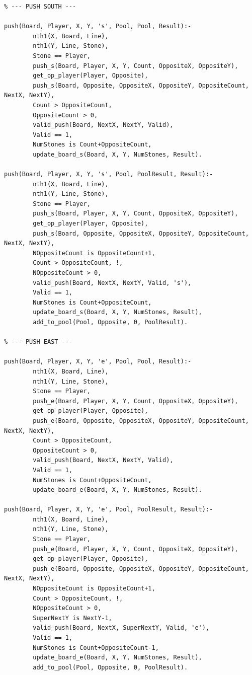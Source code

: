 \documentclass[a4paper]{article}
\begin{document}
\begin{lstlisting}
% --- PUSH SOUTH ---

push(Board, Player, X, Y, 's', Pool, Pool, Result):- 
        nth1(X, Board, Line),
        nth1(Y, Line, Stone),
        Stone == Player,
        push_s(Board, Player, X, Y, Count, OppositeX, OppositeY),
        get_op_player(Player, Opposite),
        push_s(Board, Opposite, OppositeX, OppositeY, OppositeCount, NextX, NextY),
        Count > OppositeCount,
        OppositeCount > 0,
        valid_push(Board, NextX, NextY, Valid),
        Valid == 1,
        NumStones is Count+OppositeCount,
        update_board_s(Board, X, Y, NumStones, Result).

push(Board, Player, X, Y, 's', Pool, PoolResult, Result):- 
        nth1(X, Board, Line),
        nth1(Y, Line, Stone),
        Stone == Player,
        push_s(Board, Player, X, Y, Count, OppositeX, OppositeY),
        get_op_player(Player, Opposite),
        push_s(Board, Opposite, OppositeX, OppositeY, OppositeCount, NextX, NextY),
        NOppositeCount is OppositeCount+1,
        Count > OppositeCount, !,
        NOppositeCount > 0,
        valid_push(Board, NextX, NextY, Valid, 's'),
        Valid == 1,
        NumStones is Count+OppositeCount,
        update_board_s(Board, X, Y, NumStones, Result),
        add_to_pool(Pool, Opposite, 0, PoolResult).

% --- PUSH EAST ---

push(Board, Player, X, Y, 'e', Pool, Pool, Result):- 
        nth1(X, Board, Line),
        nth1(Y, Line, Stone),
        Stone == Player,
        push_e(Board, Player, X, Y, Count, OppositeX, OppositeY),
        get_op_player(Player, Opposite),
        push_e(Board, Opposite, OppositeX, OppositeY, OppositeCount, NextX, NextY),
        Count > OppositeCount,
        OppositeCount > 0,
        valid_push(Board, NextX, NextY, Valid),
        Valid == 1,
        NumStones is Count+OppositeCount,
        update_board_e(Board, X, Y, NumStones, Result).

push(Board, Player, X, Y, 'e', Pool, PoolResult, Result):- 
        nth1(X, Board, Line),
        nth1(Y, Line, Stone),
        Stone == Player,
        push_e(Board, Player, X, Y, Count, OppositeX, OppositeY),
        get_op_player(Player, Opposite),
        push_e(Board, Opposite, OppositeX, OppositeY, OppositeCount, NextX, NextY),
        NOppositeCount is OppositeCount+1,
        Count > OppositeCount, !,
        NOppositeCount > 0,
        SuperNextY is NextY-1,
        valid_push(Board, NextX, SuperNextY, Valid, 'e'),
        Valid == 1,
        NumStones is Count+OppositeCount-1,
        update_board_e(Board, X, Y, NumStones, Result),
        add_to_pool(Pool, Opposite, 0, PoolResult).


\end{lstlisting}
\end{document}
